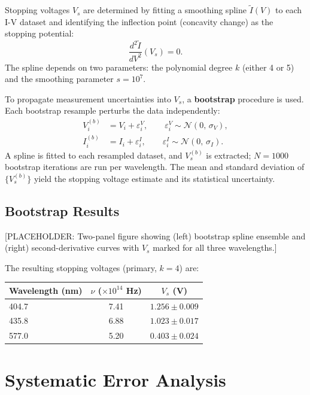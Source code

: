 \documentclass[12pt]{article}
\begin{document}
Stopping voltages $V_s$ are determined by fitting a smoothing spline $\tilde{I}(V)$ to each I-V dataset and identifying the inflection point (concavity change) as the stopping potential:
\begin{equation}
    \frac{d^2\tilde{I}}{dV^2}(V_s) = 0.
\end{equation}
The spline depends on two parameters: the polynomial degree $k$ (either 4 or 5) and the smoothing parameter $s = 10^7$.

To propagate measurement uncertainties into $V_s$, a \textbf{bootstrap} procedure is used. Each bootstrap resample perturbs the data independently:
\begin{align}
    V_i^{(b)} &= V_i + \varepsilon_i^V, \qquad \varepsilon_i^V \sim \mathcal{N}(0,\, \sigma_V), \\
    I_i^{(b)} &= I_i + \varepsilon_i^I, \qquad \varepsilon_i^I \sim \mathcal{N}(0,\, \sigma_I).
\end{align}
A spline is fitted to each resampled dataset, and $V_s^{(b)}$ is extracted; $N = 1000$ bootstrap iterations are run per wavelength. The mean and standard deviation of $\{V_s^{(b)}\}$ yield the stopping voltage estimate and its statistical uncertainty.

\subsection{Bootstrap Results}

[PLACEHOLDER: Two-panel figure showing (left) bootstrap spline ensemble and (right) second-derivative curves with $V_s$ marked for all three wavelengths.]

The resulting stopping voltages (primary, $k = 4$) are:
\begin{center}
\begin{tabular}{lcc}
\toprule
Wavelength (nm) & $\nu$ ($\times 10^{14}$ Hz) & $V_s$ (V) \\
\midrule
404.7 & 7.41 & $1.256 \pm 0.009$ \\
435.8 & 6.88 & $1.023 \pm 0.017$ \\
577.0 & 5.20 & $0.403 \pm 0.024$ \\
\bottomrule
\end{tabular}
\end{center}

\section{Systematic Error Analysis}
\end{document}
